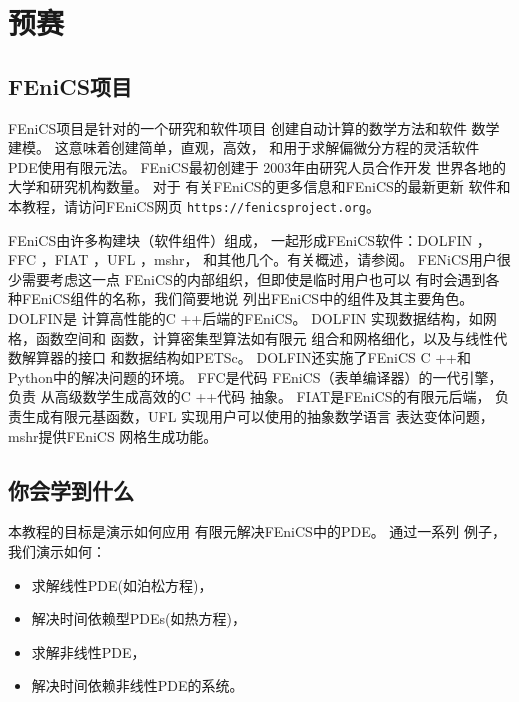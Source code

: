 \chapter{预赛}
\label{ch:prelim}

\section{FEniCS项目}
FEniCS项目是针对的一个研究和软件项目
创建自动计算的数学方法和软件
数学建模。 这意味着创建简单，直观，高效，
和用于求解偏微分方程的灵活软件
PDE使用有限元法。 FEniCS最初创建于
2003年由研究人员合作开发
世界各地的大学和研究机构数量。 对于
有关FEniCS的更多信息和FEniCS的最新更新
软件和本教程，请访问FEniCS网页
\texttt{https://fenicsproject.org}。


FEniCS由许多构建块（软件组件）组成，
一起形成FEniCS软件：DOLFIN \cite{DOLFIN}，FFC
\cite{FFC}，FIAT \cite{FIAT}，UFL \cite{UFL_2014}，mshr，
和其他几个。有关概述，请参阅\cite{FEniCS}。
FENiCS用户很少需要考虑这一点
FEniCS的内部组织，但即使是临时用户也可以
有时会遇到各种FEniCS组件的名称，我们简要地说
列出FEniCS中的组件及其主要角色。 DOLFIN是
计算高性能的C ++后端的FEniCS。 DOLFIN
实现数据结构，如网格，函数空间和
函数，计算密集型算法如有限元
组合和网格细化，以及与线性代数解算器的接口
和数据结构如PETSc。 DOLFIN还实施了FEniCS
C ++和Python中的解决问题的环境。 FFC是代码
FEniCS（表单编译器）的一代引擎，负责
从高级数学生成高效的C ++代码
抽象。 FIAT是FEniCS的有限元后端，
负责生成有限元基函数，UFL
实现用户可以使用的抽象数学语言
表达变体问题，mshr提供FEniCS
网格生成功能。

\section{你会学到什么}

本教程的目标是演示如何应用
有限元解决FEniCS中的PDE。 通过一系列
例子，我们演示如何：

\begin{itemize}
  \item 求解线性PDE(如泊松方程)，

  \item 解决时间依赖型PDEs(如热方程)，

  \item 求解非线性PDE，

  \item 解决时间依赖非线性PDE的系统。
\end{itemize}

